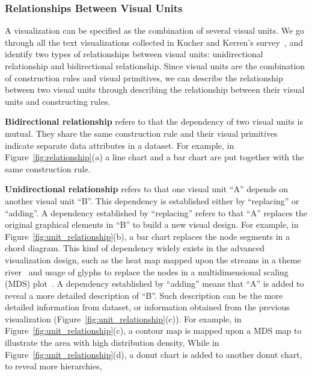 \subsubsection{Relationships Between Visual Units}
A visualization can be specified as the combination of several visual units. 
We go through all the text visualizations collected in Kucher and Kerren's survey~\cite{kucher2015text}, and identify two types of relationships between visual units: unidirectional relationship and bidirectional relationship. Since visual units are the combination of construction rules and visual primitives, we can describe the relationship between two visual units through describing the relationship between their visual units and constructing rules.  

\textbf{Bidirectional relationship} refers to that the dependency of two visual units is mutual. They share the same construction rule and their visual primitives indicate separate data attributes in a dataset.
For example, in Figure~\ref{fig:relationship}(a)  a line chart and  a bar chart are put together with the same construction rule. 

\textbf{Unidirectional relationship} refers to that one visual unit ``A'' depends on another visual unit ``B''.  This dependency is established either by ``replacing'' or ``adding''. A dependency established by ``replacing'' refers to that ``A'' replaces the original graphical elements in ``B'' to build a new visual design. For example, in Figure~\ref{fig:unit_relationship}(b), a bar chart replaces the node segments in a chord diagram. This kind of dependency widely exists in the advanced visualization design, such as the heat map mapped upon the streams in a theme river~\cite{wu_opinionflow:_2014}  and usage of glyphs to replace the nodes in a multidimensional scaling (MDS) plot~\cite{chen_peakvizor:_2016}. A dependency established by ``adding'' means that ``A'' is added to reveal a more detailed description of ``B''. Such description can be the more detailed information from dataset, or information obtained from the previous visualization (Figure~\ref{fig:unit_relationship}(c)). For example, in Figure~\ref{fig:unit_relationship}(c), a contour map is mapped upon a MDS map to illustrate the area with high distribution density,  While in Figure~\ref{fig:unit_relationship}(d), a donut chart is added to another donut chart, to reveal more hierarchies, 


